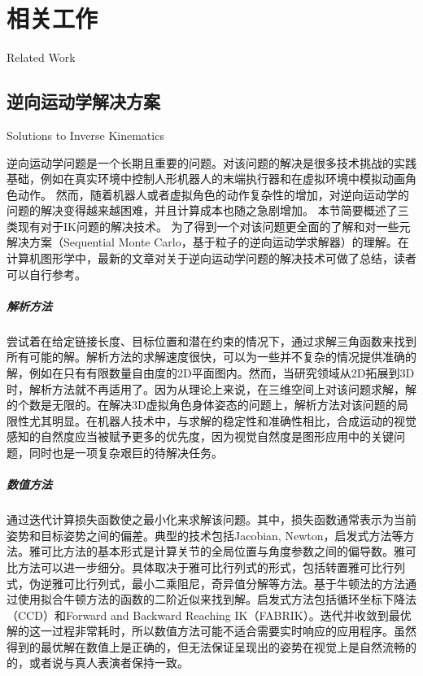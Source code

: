 \chapter{相关工作}{Related Work}
\section{逆向运动学解决方案}{Solutions to Inverse Kinematics}

逆向运动学问题是一个长期且重要的问题。对该问题的解决是很多技术挑战的实践基础，例如在真实环境中控制人形机器人的末端执行器\cite{Robot2005Motion}和在虚拟环境中模拟动画角色动作\cite{brogan1998dynamic}。 然而，随着机器人或者虚拟角色的动作复杂性的增加，对逆向运动学的问题的解决变得越来越困难，并且计算成本也随之急剧增加。 本节简要概述了三类现有对于IK问题的解决技术。 为了得到一个对该问题更全面的了解和对一些元解决方案（Sequential Monte Carlo\cite{courty2008inverse}，基于粒子的逆向运动学求解器\cite{hecker2008real}）的理解。在计算机图形学中，最新的文章\cite{aristidou2018inverse}对关于逆向运动学问题的解决技术可做了总结，读者可以自行参考。

\paragraph{解析方法}尝试着在给定链接长度、目标位置和潜在约束的情况下，通过求解三角函数来找到所有可能的解\cite{LEE1984Geomatric,deepak}。解析方法的求解速度很快，可以为一些并不复杂的情况提供准确的解，例如在只有有限数量自由度的2D平面图内。然而，当研究领域从2D拓展到3D时，解析方法就不再适用了。因为从理论上来说，在三维空间上对该问题求解，解的个数是无限的。在解决3D虚拟角色身体姿态的问题上，解析方法对该问题的局限性尤其明显。在机器人技术中，与求解的稳定性和准确性相比，合成运动的视觉感知的自然度应当被赋予更多的优先度，因为视觉自然度是图形应用中的关键问题，同时也是一项复杂艰巨的待解决任务。

\paragraph{数值方法}通过迭代计算损失函数使之最小化来求解该问题。其中，损失函数通常表示为当前姿势和目标姿势之间的偏差。典型的技术包括Jacobian, Newton，启发式方法等方法。雅可比方法的基本形式是计算关节的全局位置与角度参数之间的偏导数\cite{buss2004introduction}。雅可比方法可以进一步细分。具体取决于雅可比行列式的形式，包括转置雅可比行列式\cite{unzueta2008full}，伪逆雅可比行列式\cite{mukherjee2015inverse}，最小二乘阻尼\cite{harish2016parallel}，奇异值分解\cite{colome2012redundant}等方法。基于牛顿法的方法通过使用拟合牛顿方法\cite{zhao1994inverse,rose1996efficient}的函数的二阶近似来找到解。启发式方法包括循环坐标下降法（CCD）\cite{kenwright2012inverse}和Forward and Backward Reaching IK（FABRIK）\cite{aristidou2011fabrik}。迭代并收敛到最优解的这一过程非常耗时，所以数值方法可能不适合需要实时响应的应用程序。虽然得到的最优解在数值上是正确的，但无法保证呈现出的姿势在视觉上是自然流畅的的，或者说与真人表演者保持一致。

